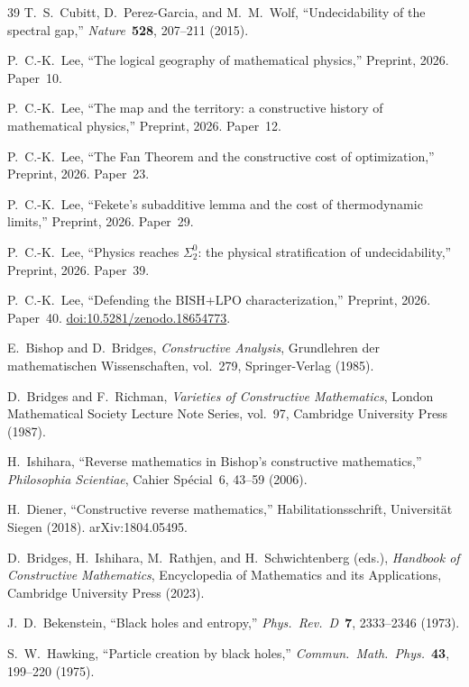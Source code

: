 \documentclass[11pt,a4paper]{article}
\theoremstyle{plain}
\theoremstyle{definition}
\newcommand{\LPO}{\ensuremath{\mathrm{LPO}}}
\newcommand{\BISH}{\ensuremath{\mathrm{BISH}}}
\begin{document}
\begin{thebibliography}{39}
T.~S.~Cubitt, D.~Perez-Garcia, and M.~M.~Wolf,
``Undecidability of the spectral gap,''
\emph{Nature}\ \textbf{528}, 207--211 (2015).

P.~C.-K.~Lee,
``The logical geography of mathematical physics,''
Preprint, 2026. Paper~10.

P.~C.-K.~Lee,
``The map and the territory: a constructive history of
  mathematical physics,''
Preprint, 2026. Paper~12.

P.~C.-K.~Lee,
``The Fan Theorem and the constructive cost of optimization,''
Preprint, 2026. Paper~23.

P.~C.-K.~Lee,
``Fekete's subadditive lemma and the cost of thermodynamic limits,''
Preprint, 2026. Paper~29.

P.~C.-K.~Lee,
``Physics reaches $\Sigma_2^0$: the physical stratification of undecidability,''
Preprint, 2026. Paper~39.

P.~C.-K.~Lee,
``Defending the $\BISH$+$\LPO$ characterization,''
Preprint, 2026. Paper~40.
\href{https://doi.org/10.5281/zenodo.18654773}{doi:10.5281/zenodo.18654773}.

E.~Bishop and D.~Bridges,
\emph{Constructive Analysis},
Grundlehren der mathematischen Wissenschaften, vol.~279,
Springer-Verlag (1985).

D.~Bridges and F.~Richman,
\emph{Varieties of Constructive Mathematics},
London Mathematical Society Lecture Note Series, vol.~97,
Cambridge University Press (1987).

H.~Ishihara,
``Reverse mathematics in Bishop's constructive mathematics,''
\emph{Philosophia Scientiae}, Cahier Sp\'ecial~6, 43--59 (2006).

H.~Diener,
``Constructive reverse mathematics,''
Habilitationsschrift, Universit\"at Siegen (2018).
arXiv:1804.05495.

D.~Bridges, H.~Ishihara, M.~Rathjen, and H.~Schwichtenberg (eds.),
\emph{Handbook of Constructive Mathematics},
Encyclopedia of Mathematics and its Applications,
Cambridge University Press (2023).

J.~D.~Bekenstein,
``Black holes and entropy,''
\emph{Phys.\ Rev.\ D}\ \textbf{7}, 2333--2346 (1973).

S.~W.~Hawking,
``Particle creation by black holes,''
\emph{Commun.\ Math.\ Phys.}\ \textbf{43}, 199--220 (1975).


\end{thebibliography}
\end{document}
